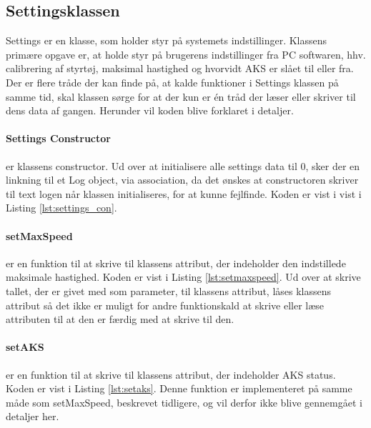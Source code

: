 \subsection{Settingsklassen} \label{sec:settings_impl}

Settings er en klasse, som holder styr på systemets indstillinger. Klassens primære opgave er, at holde styr på brugerens indstillinger fra PC softwaren, hhv. calibrering af styrtøj, maksimal hastighed og hvorvidt AKS er slået til eller fra.
Der er flere tråde der kan finde på, at kalde funktioner i Settings klassen på samme tid, skal klassen sørge for at der kun er én tråd der læser eller skriver til dens data af gangen.
Herunder vil koden blive forklaret i detaljer.


\paragraph{Settings Constructor} er klassens constructor. Ud over at initialisere alle settings data til 0, sker der en linkning til et Log object, via association, da det ønskes at constructoren skriver til text logen når klassen initialiseres, for at kunne fejlfinde. Koden er vist i vist i Listing \ref{lst:settings_con}.




\paragraph{setMaxSpeed} er en funktion til at skrive til klassens attribut, der indeholder den indstillede maksimale hastighed. Koden er vist i Listing \ref{lst:setmaxspeed}. Ud over at skrive tallet, der er givet med som parameter, til klassens attribut, låses klassens attribut så det ikke er muligt for andre funktionskald at skrive eller læse attributen til at den er færdig med at skrive til den. 




\paragraph{setAKS} er en funktion til at skrive til klassens attribut, der indeholder AKS status. Koden er vist i Listing \ref{lst:setaks}. Denne funktion er implementeret på samme måde som setMaxSpeed, beskrevet tidligere, og vil derfor ikke blive gennemgået i detaljer her.

